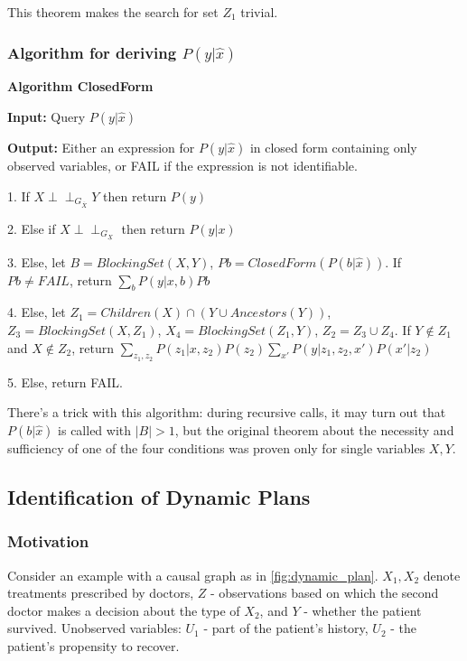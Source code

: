 \documentclass[fleqn]{article}
\newcommand{\independent}{\perp \!\!\! \perp}
\numberwithin{equation}{section}
\numberwithin{theorem}{section}
\numberwithin{figure}{section}
\numberwithin{lemma}{section}
\numberwithin{corollary}{section}
\begin{document}
This theorem makes the search for set $Z_1$ trivial.

\subsubsection*{Algorithm for deriving $P(y|\hat x)$}

\textbf{Algorithm ClosedForm}

\textbf{Input:} Query $P(y|\hat x)$

\textbf{Output:} Either an expression for $P(y|\hat x)$ in closed form containing only observed variables, or FAIL if the expression is not identifiable.

1. If $X \independent_{G_{\overline X}} Y$ then return $P(y)$

2. Else if $X \independent_{G_{\underline{X}}}$ then return $P(y|x)$

3. Else, let $B = BlockingSet(X, Y)$, $Pb = ClosedForm(P(b|\hat x))$. If $Pb \neq FAIL$, return $\sum\limits_{b}P(y|x,b)Pb$

4. Else, let $Z_1 = Children(X) \cap (Y \cup Ancestors(Y))$, $Z_3 = BlockingSet(X, Z_1)$, $X_4 = BlockingSet(Z_1, Y)$, $Z_2 = Z_3 \cup Z_4$. If $Y \notin Z_1$ and $X \notin Z_2$, return $\sum\limits_{z_1, z_2}P(z_1|x,z_2)P(z_2)\sum\limits_{x'}P(y|z_1, z_2, x')P(x'|z_2)$

5. Else, return FAIL.

There's a trick with this algorithm: during recursive calls, it may turn out that $P(b|\hat x)$ is called with $|B| > 1$, but the original theorem about the necessity and sufficiency of one of the four conditions was proven only for single variables $X, Y$.

\subsection*{Identification of Dynamic Plans}

\subsubsection*{Motivation}

Consider an example with a causal graph as in \ref{fig:dynamic_plan}. $X_1, X_2$ denote treatments prescribed by doctors, $Z$ - observations based on which the second doctor makes a decision about the type of $X_2$, and $Y$ - whether the patient survived. Unobserved variables: $U_1$ - part of the patient's history, $U_2$ - the patient's propensity to recover.
\end{document}
